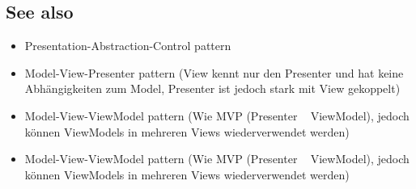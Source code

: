 \subsection*{See also}


\begin{itemize}
	\item Presentation-Abstraction-Control pattern
	\item Model-View-Presenter pattern (View kennt nur den Presenter und hat keine Abhängigkeiten zum Model, Presenter ist jedoch stark mit View gekoppelt)
	\item Model-View-ViewModel pattern (Wie MVP (Presenter ~ ViewModel), jedoch können ViewModels in mehreren Views wiederverwendet werden)
\end{itemize}

\begin{itemize}
	\item Model-View-ViewModel pattern (Wie MVP (Presenter ~ ViewModel), jedoch können ViewModels in mehreren Views wiederverwendet werden)
\end{itemize}

